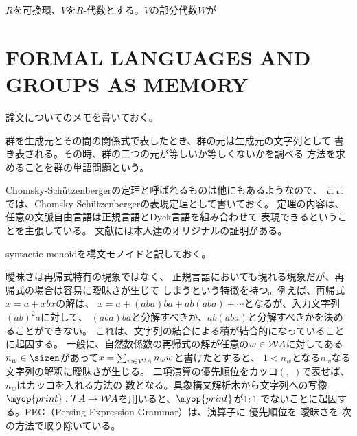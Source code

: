 	\begin{definition}[イデアル]\label{def:イデアル} %
		$R$を可換環、$V$を$R$-代数とする。$V$の部分代数$W$が
	\end{definition} %
\section{FORMAL LANGUAGES AND GROUPS AS MEMORY}\label{s1:FORMAL LANGUAGES AND GROUPS AS MEMORY} %
	論文\cite{arxiv:kambites:chomsky}についてのメモを書いておく。

	\begin{definition}[群の単語問題]\label{def:群の単語問題} %
		群を生成元とその間の関係式で表したとき、群の元は生成元の文字列として
		書き表される。その時、群の二つの元が等しいか等しくないかを調べる
		方法を求めることを群の単語問題という。
	\end{definition} %

	\begin{description}\setlength{\itemsep}{-1mm} %
		\item[Chomsky-Shutzenbergerの表現定理] 
		Chomsky-Sch{\"u}tzenbergerの定理と呼ばれるものは他にもあるようなので、
		ここでは、Chomsky-Sch{\"u}tzenbergerの表現定理として書いておく。
		定理の内容は、任意の文脈自由言語は正規言語とDyck言語を組み合わせて
		表現できるということを主張している。
		文献\cite{chomsky:schutzenberger}には本人達のオリジナルの証明がある。
		\item[構文モノイド] syntactic monoidを構文モノイドと訳しておく。
		\item[再帰式における曖昧さ] 曖昧さは再帰式特有の現象ではなく、
		正規言語においても現れる現象だが、再帰式の場合は容易に曖昧さが生じて
		しまうという特徴を持つ。例えば、再帰式$x=a+xbx$の解は、
		$x=a+(aba)ba+ab(aba)+\cdots$となるが、入力文字列$(ab)^2a$に対して、
		$(aba)ba$と分解すべきか、$ab(aba)$と分解すべきかを決めることができない。
		これは、文字列の結合による積が結合的になっていることに起因する。
		一般に、自然数係数の再帰式の解が任意の$w\in\mathcal{W} A$に対してある
		$n_w\in\sizen$があって$x=\sum_{w\in\mathcal{W} A}n_ww$と書けたとすると、
		$1<n_w$となる$n_w$なる文字列の解釈に曖昧さが生じる。
		二項演算の優先順位をカッコ$(,\;)$で表せば、$n_w$はカッコを入れる方法の
		数となる。具象構文解析木から文字列への写像
		$\myop{print}:\Tree A\to \Word A$を用いると、$\myop{print}$が$1:1$
		でないことに起因する。PEG（Persing Expression Grammar）は、演算子に
		優先順位を
		曖昧さを
		次の方法で取り除いている。
	\end{description} %


